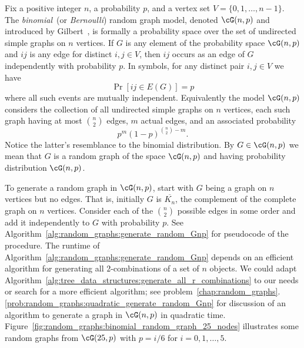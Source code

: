 Fix a positive integer $n$, a probability $p$, and a vertex set
$V = \{0, 1, \dots, n - 1\}$. The
\emph{binomial}~(or
\emph{Bernoulli}) random graph model,
denoted $\cG(n,p)$ and introduced by Gilbert~\cite{Gilbert1959}, is
formally a probability space over the set of
undirected simple graphs on $n$ vertices. If $G$ is any element of the
probability space $\cG(n,p)$ and $ij$ is any edge for distinct
$i,j \in V$, then $ij$ occurs as an edge of $G$ independently with
probability $p$. In symbols, for any distinct pair $i,j \in V$ we have
\[
\Pr[ij \in E(G)]
=
p
\]
where all such events are mutually independent. Equivalently the model
$\cG(n,p)$ considers the collection of all undirected simple graphs on
$n$ vertices, each such graph having at most $\binom{n}{2}$ edges, $m$
actual edges, and an associated probability
\begin{equation}
\label{eqn:random_graphs:probability_of_chosen_graph_binomial_model}
p^m (1 - p)^{\binom{n}{2} - m}.
\end{equation}
Notice the latter's resemblance to the
binomial distribution. By
$G \in \cG(n,p)$ we mean that $G$ is a random graph of the space
$\cG(n,p)$ and having probability
distribution $\cG(n,p)$.

To generate a random graph in $\cG(n,p)$, start with $G$ being a graph
on $n$ vertices but no edges. That is, initially $G$ is
$\overline{K_n}$, the complement of the complete
graph on $n$ vertices. Consider each of the $\binom{n}{2}$ possible
edges in some order and add it independently to $G$ with probability
$p$. See Algorithm~\ref{alg:random_graphs:generate_random_Gnp} for
pseudocode of the procedure. The runtime of
Algorithm~\ref{alg:random_graphs:generate_random_Gnp} depends on an
efficient algorithm for generating all $2$-combinations of a set of
$n$ objects. We could adapt
Algorithm~\ref{alg:tree_data_structures:generate_all_r_combinations}
to our needs or search for a more efficient algorithm; see
problem~\ref{chap:random_graphs}.\ref{prob:random_graphs:quadratic_generate_random_Gnp}
for discussion of an algorithm to generate a graph in $\cG(n,p)$ in
quadratic
time. Figure~\ref{fig:random_graphs:binomial_random_graph_25_nodes}
illustrates some random graphs from $\cG(25,p)$ with $p = i/6$ for
$i = 0, 1, \dots, 5$.

